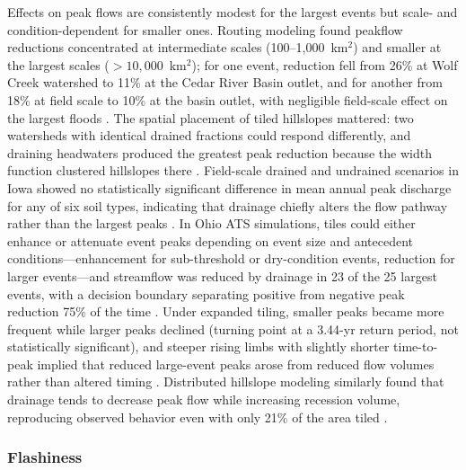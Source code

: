 \documentclass[11pt]{article}
\begin{document}
Effects on peak flows are consistently modest for the largest events but scale- and condition-dependent for smaller ones. Routing modeling found peakflow reductions concentrated at intermediate scales (100--1{,}000~km$^2$) and smaller at the largest scales ($>10{,}000$~km$^2$); for one event, reduction fell from 26\% at Wolf Creek watershed to 11\% at the Cedar River Basin outlet, and for another from 18\% at field scale to 10\% at the basin outlet, with negligible field-scale effect on the largest floods \parencite{Sloan2017}. The spatial placement of tiled hillslopes mattered: two watersheds with identical drained fractions could respond differently, and draining headwaters produced the greatest peak reduction because the width function clustered hillslopes there \parencite{Sloan2017}. Field-scale drained and undrained scenarios in Iowa showed no statistically significant difference in mean annual peak discharge for any of six soil types, indicating that drainage chiefly alters the flow pathway rather than the largest peaks \parencite{Sloan2016}. In Ohio ATS simulations, tiles could either enhance or attenuate event peaks depending on event size and antecedent conditions---enhancement for sub-threshold or dry-condition events, reduction for larger events---and streamflow was reduced by drainage in 23 of the 25 largest events, with a decision boundary separating positive from negative peak reduction 75\% of the time \parencite{Rathore2025}. Under expanded tiling, smaller peaks became more frequent while larger peaks declined (turning point at a 3.44-yr return period, not statistically significant), and steeper rising limbs with slightly shorter time-to-peak implied that reduced large-event peaks arose from reduced flow volumes rather than altered timing \parencite{Rahman2014}. Distributed hillslope modeling similarly found that drainage tends to decrease peak flow while increasing recession volume, reproducing observed behavior even with only 21\% of the area tiled \parencite{Fonley2021}.

\subsubsection{Flashiness}
\end{document}
